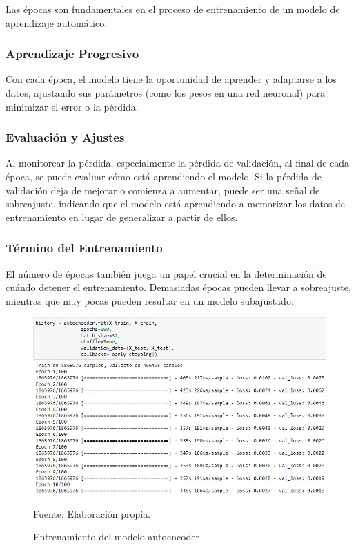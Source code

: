 Las épocas son fundamentales en el proceso de entrenamiento de un modelo de aprendizaje automático:

\subsubsection{Aprendizaje Progresivo} 
Con cada época, el modelo tiene la oportunidad de aprender y adaptarse a los datos, ajustando sus parámetros (como los pesos en una red neuronal) para minimizar el error o la pérdida.

\subsubsection{Evaluación y Ajustes} 
Al monitorear la pérdida, especialmente la pérdida de validación, al final de cada época, se puede evaluar cómo está aprendiendo el modelo. Si la pérdida de validación deja de mejorar o comienza a aumentar, puede ser una señal de sobreajuste, indicando que el modelo está aprendiendo a memorizar los datos de entrenamiento en lugar de generalizar a partir de ellos.

\subsubsection{Término del Entrenamiento} 
El número de épocas también juega un papel crucial en la determinación de cuándo detener el entrenamiento. Demasiadas épocas pueden llevar a sobreajuste, mientras que muy pocas pueden resultar en un modelo subajustado.

\begin{figure}[H]
    \begin{minipage}[t]{0.9\textwidth}
        \caption{Entrenamiento del modelo autoencoder}
        \label{entrenamiento_autoencoder}        
    \end{minipage}

    \vspace{10pt}

    \begin{minipage}[b]{0.99\textwidth}
        \centering
        \includegraphics[width=\textwidth]{img/Entrenamiento autoencoder.jpg}        
    \end{minipage}

    \begin{minipage}[t]{0.9\textwidth}
        Fuente: Elaboración propia.
    \end{minipage}
\end{figure}

